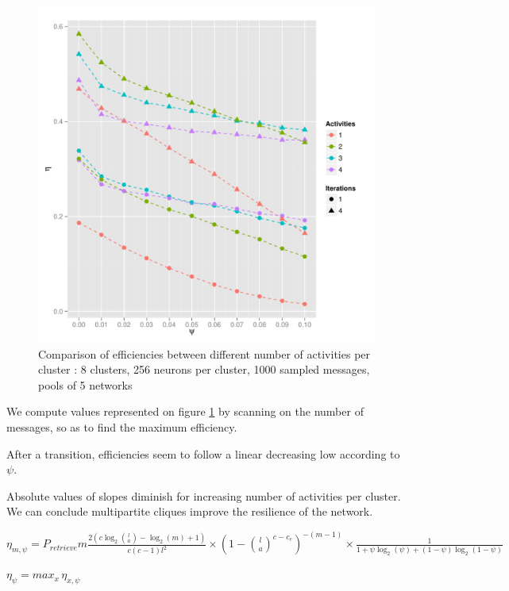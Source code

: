 \documentclass[english,11pt,twocolumn]{article}
\theoremstyle{definition}
\begin{document}
	\begin{figure}
		
		\includegraphics[scale=0.50]{Courbes/5portant_psi_c8l256e4}
		\caption{Comparison of efficiencies between different number of activities per cluster :  8 clusters, 256 neurons per cluster, 1000 sampled messages, pools of 5 networks \label{comppsi}}
	\end{figure}

	We compute values represented on figure \ref{comppsi} by scanning on the number of messages, so as to find the maximum efficiency.	
	
	After a transition, efficiencies seem to follow a linear decreasing low according to $\psi$.	
	
	Absolute values of slopes diminish for increasing number of activities per cluster. We can conclude multipartite cliques improve the resilience of the network.
	
	$\eta_{m, \psi} = P_{retrieve} m  \frac{2 \left(c \log_2{l \choose a } - \log_2(m) + 1 \right)}{c(c-1)l^2} \times (1-{l \choose a}^{c - c_e})^{-(m-1)} \times \frac{1}{1 + \psi \log_2(\psi) +(1-\psi) \log_2(1-\psi)} $
	
	$\eta_\psi = max_x \, \eta_{x, \psi}$
	
\end{document}

